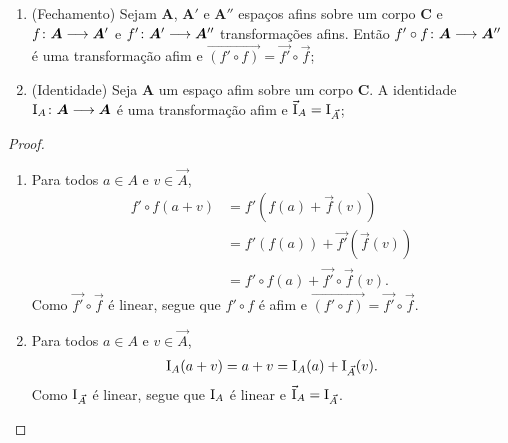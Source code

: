 \begin{proposition}
	\begin{enumerate}
		\item (Fechamento) Sejam $\bm A$, $\bm A'$ e $\bm A''$ espaços afins sobre um corpo $\bm C$ e ${f}\colon {\bm A} \longrightarrow {\bm A'}$ e ${f'}\colon {\bm A'} \longrightarrow {\bm A''}$ transformações afins. Então ${f' \circ f}\colon {\bm A} \longrightarrow {\bm A''}$ é uma transformação afim e $\vec{(f' \circ f)} = \vec{f'} \circ \vec{f}$;

		\item (Identidade) Seja $\bm A$ um espaço afim sobre um corpo $\bm C$. A identidade ${\mathrm{I}_A}\colon {\bm A} \longrightarrow {\bm A}$ é uma transformação afim e $\vec{\mathrm{I}}_A=\mathrm{I}_{\vec{A}}$;

	\end{enumerate}
\end{proposition}
\begin{proof}
	\begin{enumerate}
		\item Para todos $a \in A$ e $v \in \vec{A}$,
			\begin{align*}
				f' \circ f (a+v) &= f'(f(a)+\vec{f}(v)) \\
					&= f'(f(a)) + \vec{f'}(\vec{f}(v)) \\
					&= f' \circ f(a) + \vec{f'} \circ \vec{f}(v).
			\end{align*}
		Como $\vec{f'} \circ \vec{f}$ é linear, segue que $f' \circ f$ é afim e $\vec{(f' \circ f)} = \vec{f'} \circ \vec{f}$.

		\item Para todos $a \in A$ e $v \in \vec{A}$,
			\begin{align*}
				\mathrm{I}_A(a+v) = a+v = \mathrm{I}_A(a) + \mathrm{I}_{\vec{A}}(v).
			\end{align*}
		Como $\mathrm{I}_{\vec{A}}$ é linear, segue que $\mathrm{I}_A$ é linear e $\vec{\mathrm{I}}_A=\mathrm{I}_{\vec{A}}$.


	\end{enumerate}
\end{proof}


